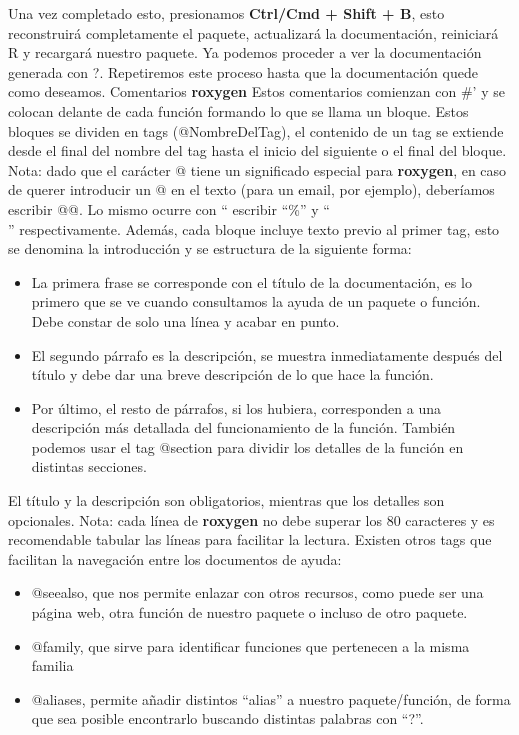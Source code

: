 Una vez completado esto, presionamos \textbf{Ctrl/Cmd + Shift + B}, esto reconstruir\'a
completamente el paquete, actualizar\'a la documentaci\'on, reiniciar\'a R y recargar\'a nuestro
paquete. Ya podemos proceder a ver la documentaci\'on generada con ?. Repetiremos este
proceso hasta que la documentaci\'on quede como deseamos.
Comentarios \textbf{roxygen}
Estos comentarios comienzan con \#' y se colocan delante de cada funci\'on formando lo que
se llama un bloque. Estos bloques se dividen en tags (@NombreDelTag), el contenido de un
tag se extiende desde el final del nombre del tag hasta el inicio del siguiente o el final del
bloque.
Nota: dado que el car\'acter @ tiene un significado especial para \textbf{roxygen}, en caso de querer
introducir un @ en el texto (para un email, por ejemplo), deber\'iamos escribir @@. Lo mismo
ocurre con “%
escribir “\%” y “\\” respectivamente.
Adem\'as, cada bloque incluye texto previo al primer tag, esto se denomina la introducci\'on y
se estructura de la siguiente forma:

\begin{itemize}
    \item La primera frase se corresponde con el t\'itulo de la documentaci\'on, es lo primero que
se ve cuando consultamos la ayuda de un paquete o funci\'on. Debe constar de solo
una l\'inea y acabar en punto.
    \item El segundo p\'arrafo es la descripci\'on, se muestra inmediatamente despu\'es del t\'itulo y
debe dar una breve descripci\'on de lo que hace la funci\'on.
    \item Por \'ultimo, el resto de p\'arrafos, si los hubiera, corresponden a una descripci\'on m\'as
detallada del funcionamiento de la funci\'on. Tambi\'en podemos usar el tag @section
para dividir los detalles de la funci\'on en distintas secciones.
\end{itemize}

El t\'itulo y la descripci\'on son obligatorios, mientras que los detalles son opcionales.
Nota: cada l\'inea de \textbf{roxygen} no debe superar los 80 caracteres y es recomendable tabular
las l\'ineas para facilitar la lectura.
Existen otros tags que facilitan la navegaci\'on entre los documentos de ayuda:

\begin{itemize}
    \item @seealso, que nos permite enlazar con otros recursos, como puede ser una p\'agina
web, otra funci\'on de nuestro paquete o incluso de otro paquete.
    \item @family, que sirve para identificar funciones que pertenecen a la misma familia
    \item @aliases, permite a\~nadir distintos “alias” a nuestro paquete/funci\'on, de forma que
sea posible encontrarlo buscando distintas palabras con “?”.
\end{itemize}

